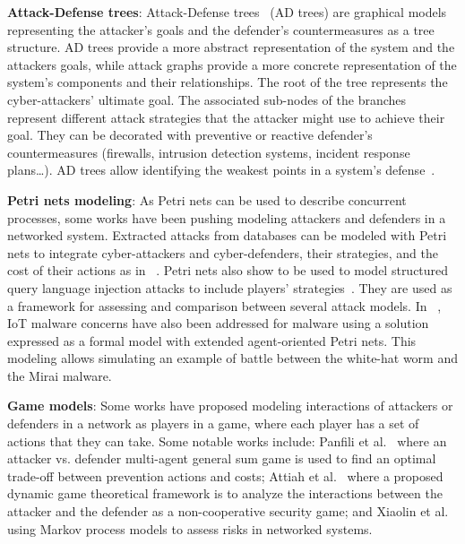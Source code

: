 

\noindent
\textbf{Attack-Defense trees}: \quad Attack-Defense trees~\cite{BKordy2010} (AD trees) are graphical models representing the attacker's goals and the defender's countermeasures as a tree structure. AD trees provide a more abstract representation of the system and the attackers goals, while attack graphs provide a more concrete representation of the system's components and their relationships. The root of the tree represents the cyber-attackers' ultimate goal. The associated sub-nodes of the branches represent different attack strategies that the attacker might use to achieve their goal. They can be decorated with preventive or reactive defender's countermeasures (firewalls, intrusion detection systems, incident response plans\dots).
AD trees allow identifying the weakest points in a system's defense~\cite{BKordy2010}.


\noindent
\textbf{Petri nets modeling}: \quad As Petri nets can be used to describe concurrent processes, some works have been pushing modeling attackers and defenders in a networked system.
Extracted attacks from databases can be modeled with Petri nets to integrate cyber-attackers and cyber-defenders, their strategies, and the cost of their actions as in ~\cite{MPetty2022}. Petri nets also show to be used to model structured query language injection attacks to include players' strategies~\cite{JBland2020}.
They are used as a framework for assessing and comparison between several attack models.
In ~\cite{SYamaguchi2020}, IoT malware concerns have also been addressed for  malware using a  solution expressed as a formal model with extended agent-oriented Petri nets. This modeling allows simulating an example of battle between the white-hat worm and the Mirai malware.


\noindent
\textbf{Game models}: \quad Some works have proposed modeling interactions of attackers or defenders in a network as players in a game, where each player has a set of actions that they can take.
Some notable works include: Panfili et al.~\cite{MPanfili2018} where an attacker vs. defender multi-agent general sum game is used to find an optimal trade-off between prevention actions and costs; Attiah et al.~\cite{AAttiah2018} where a proposed dynamic game theoretical framework is to analyze the interactions between the attacker and the defender as a non-cooperative security game; and Xiaolin et al.~\cite{CXiaolin2008} using Markov process models to assess risks in networked systems.

